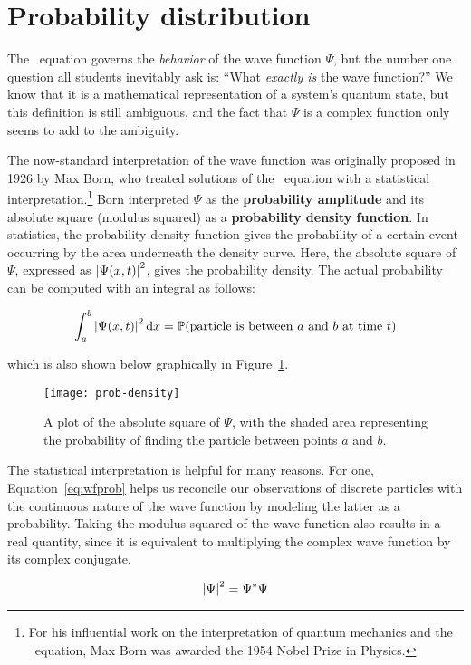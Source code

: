 \section{Probability distribution} \label{sec:prob}
The \Sch\ equation governs the \emph{behavior} of the wave function $\Psi$, but the number one question all students inevitably ask is: ``What \emph{exactly is} the wave function?'' We know that it is a mathematical representation of a system's quantum state, but this definition is still ambiguous, and the fact that $\Psi$ is a complex function only seems to add to the ambiguity. \par 

The now-standard interpretation of the wave function was originally proposed in 1926 by Max Born, who treated solutions of the \Sch\ equation with a statistical interpretation.\footnote{For his influential work on the interpretation of quantum mechanics and the \Sch\ equation, Max Born was awarded the 1954 Nobel Prize in Physics.} Born interpreted $\Psi$ as the \textbf{probability amplitude} and its absolute square (modulus squared) as a \textbf{probability density function}. In statistics, the probability density function gives the probability of a certain event occurring by the area underneath the density curve. Here, the absolute square of $\Psi$, expressed as $\abs{\Psi(x,t)}^2$, gives the probability density. The actual probability can be computed with an integral as follows:
\begin{tcolorbox}[title=Born's statistical interpretation] \vspace{-2ex}
\begin{equation}
	\int_a^b \abs{\Psi(x,t)}^2 \dd{x} = \mathbb{P}\text{(particle is between $a$ and $b$ at time $t$)} \label{eq:wfprob}
\end{equation}
\end{tcolorbox}

which is also shown below graphically in Figure~\ref{fig:wfprob}.
\begin{figure}[!h]
	\centering
	\texttt{[image: prob-density]}
	\caption{A plot of the absolute square of $\Psi$, with the shaded area representing the probability of finding the particle between points $a$ and $b$.}
	\label{fig:wfprob}
\end{figure}

The statistical interpretation is helpful for many reasons. For one, Equation~\ref{eq:wfprob} helps us reconcile our observations of discrete particles with the continuous nature of the wave function by modeling the latter as a probability. Taking the modulus squared of the wave function also results in a real quantity, since it is equivalent to multiplying the complex wave function by its complex conjugate.
\begin{tcolorbox}[title=Key point: modulus squared of a complex number] \vspace{-2ex}
	\begin{equation}
		\abs{\Psi}^2 = \Psi^*\Psi
	\end{equation}
\end{tcolorbox}

